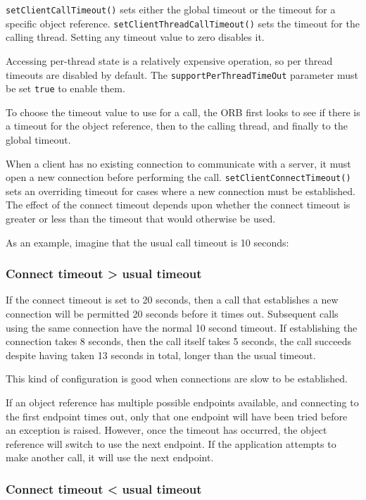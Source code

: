 \documentclass[11pt,oneside,a4paper]{book}
\newcommand{\code}[1]{\texttt{#1}}
\newcommand{\op}[1]{\texttt{#1()}}
\newcommand{\dsc}{\discretionary{}{}{}}
\begin{document}
\op{setClientCallTimeout} sets either the global timeout or the
timeout for a specific object reference.
\op{setClientThreadCallTimeout} sets the timeout for the calling
thread. Setting any timeout value to zero disables it.

Accessing per-thread state is a relatively expensive operation, so per
thread timeouts are disabled by default. The
\code{supportPerThreadTimeOut} parameter must be set \code{true} to
enable them.

To choose the timeout value to use for a call, the ORB first looks to
see if there is a timeout for the object reference, then to the
calling thread, and finally to the global timeout.

When a client has no existing connection to communicate with a server,
it must open a new connection before performing the
call. \op{setClientConnect\dsc{}Timeout} sets an overriding timeout for
cases where a new connection must be established. The effect of the
connect timeout depends upon whether the connect timeout is greater
or less than the timeout that would otherwise be used.

\vspace{\baselineskip}\noindent
As an example, imagine that the usual call timeout is 10 seconds:

\subsubsection*{Connect timeout > usual timeout}

If the connect timeout is set to 20 seconds, then a call that
establishes a new connection will be permitted 20 seconds before it
times out. Subsequent calls using the same connection have the normal
10 second timeout. If establishing the connection takes 8 seconds,
then the call itself takes 5 seconds, the call succeeds despite having
taken 13 seconds in total, longer than the usual timeout.

This kind of configuration is good when connections are slow to be
established.

If an object reference has multiple possible endpoints available, and
connecting to the first endpoint times out, only that one endpoint
will have been tried before an exception is raised. However, once the
timeout has occurred, the object reference will switch to use the next
endpoint. If the application attempts to make another call, it will
use the next endpoint.


\subsubsection*{Connect timeout < usual timeout}
\end{document}
